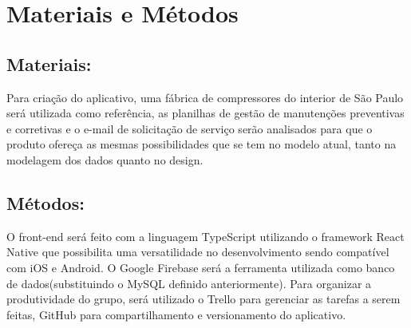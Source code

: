 \documentclass[%
  a4paper,%
  12pt,%
  english,%
  brazilian,%
]{article}
\begin{document}
\section{Materiais e Métodos}%



\subsection{Materiais:}%
Para criação do aplicativo, uma fábrica de compressores do interior de São Paulo será utilizada como referência, as planilhas de gestão de manutenções preventivas e corretivas e o e-mail de solicitação de serviço serão analisados para que o produto ofereça as mesmas possibilidades que se tem no modelo atual, tanto na modelagem dos dados quanto no design.

\subsection{Métodos:}%
O front-end será feito com a linguagem TypeScript utilizando o framework React Native que possibilita uma versatilidade no desenvolvimento sendo compatível com iOS e Android.
O Google Firebase será a ferramenta utilizada como banco de dados(substituindo o MySQL definido anteriormente). 
Para organizar a produtividade do grupo, será utilizado o Trello para gerenciar as tarefas a serem feitas, GitHub para compartilhamento e versionamento do aplicativo. 



\end{document}
